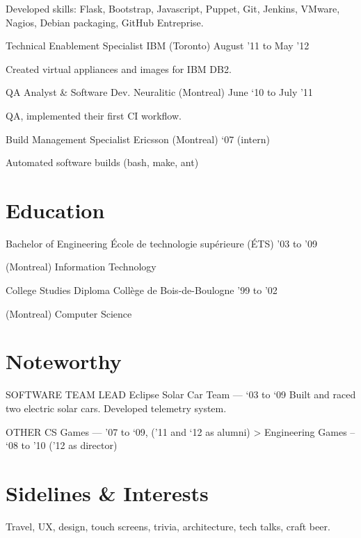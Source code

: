 \documentclass[]{cvpn}
\begin{document}
\begin{eventlist}
Developed skills: Flask, Bootstrap, Javascript,
Puppet, Git, Jenkins, VMware, Nagios, Debian packaging,
GitHub Entreprise.

\item{Technical Enablement Specialist}
     {IBM (Toronto)}
     {August '11 to May '12}

Created virtual appliances and images for IBM DB2.

\item{QA Analyst \& Software Dev.}
     {Neuralitic (Montreal)}
     {June ‘10 to July ’11}

QA, implemented their first CI workflow.

\item{Build Management Specialist}
     {Ericsson (Montreal)}
     {‘07 (intern)}

Automated software builds (bash, make, ant)

\end{eventlist}

\section{Education}

\begin{eventlist}

\item{Bachelor of Engineering}
     {École de technologie supérieure (ÉTS)}
     {'03 to '09}

(Montreal) Information Technology

\item{College Studies Diploma}
     {Collège de Bois-de-Boulogne}
     {'99 to '02}

(Montreal) Computer Science

\end{eventlist}

\section{Noteworthy}
SOFTWARE TEAM LEAD
Eclipse Solar Car Team --- ‘03 to ‘09
Built and raced two electric solar cars. Developed telemetry system.

OTHER
CS Games --- ’07 to ‘09, (’11 and ‘12 as alumni) > Engineering Games – ‘08 to ’10 (’12 as director)

\section{Sidelines \& Interests}
Travel, UX, design, touch screens, trivia, architecture, tech talks, craft beer.
\end{document}
